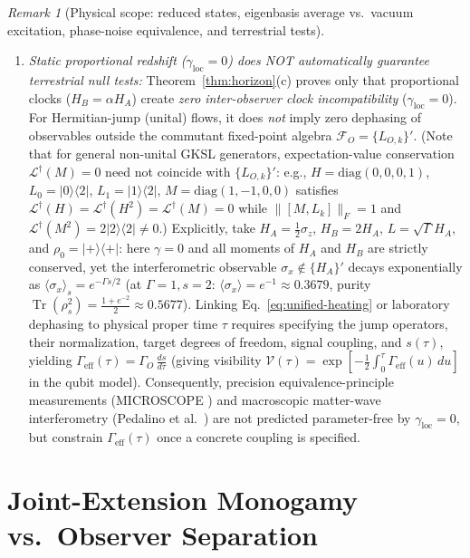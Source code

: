 \documentclass[11pt,a4paper]{article}
\theoremstyle{definition}
\theoremstyle{remark}
\newtheorem{remark}{Remark}
\newcommand{\Tr}{\operatorname{Tr}}
\newcommand{\cL}{\mathcal{L}}
\newcommand{\cF}{\mathcal{F}}
\newcommand{\1}{\mathbf{1}}
\newcommand{\normF}[1]{\|#1\|_F}
\begin{document}
\begin{remark}[Physical scope: reduced states, eigenbasis average vs.\ vacuum excitation, phase-noise equivalence, and terrestrial tests]
\begin{enumerate}
  \item \emph{Static proportional redshift ($\gamma_{\mathrm{loc}}=0$) does NOT automatically guarantee terrestrial null tests:} Theorem~\ref{thm:horizon}(c) proves only that proportional clocks ($H_B = \alpha H_A$) create \emph{zero inter-observer clock incompatibility} ($\gamma_{\mathrm{loc}} = 0$). For Hermitian-jump (unital) flows, it does \emph{not} imply zero dephasing of observables outside the commutant fixed-point algebra $\cF_O = \{L_{O,k}\}'$. (Note that for general non-unital GKSL generators, expectation-value conservation $\cL^\dagger(M)=0$ need not coincide with $\{L_{O,k}\}'$: e.g., $H=\mathrm{diag}(0,0,0,1)$, $L_0=|0\rangle\langle 2|$, $L_1=|1\rangle\langle 2|$, $M=\mathrm{diag}(1,-1,0,0)$ satisfies $\cL^\dagger(H)=\cL^\dagger(H^2)=\cL^\dagger(M)=0$ while $\normF{[M,L_k]}=1$ and $\cL^\dagger(M^2)=2|2\rangle\langle 2|\neq 0$.) Explicitly, take $H_A = \frac{1}{2}\sigma_z$, $H_B = 2H_A$, $L = \sqrt{\Gamma}H_A$, and $\rho_0 = |+\rangle\langle +|$: here $\gamma = 0$ and all moments of $H_A$ and $H_B$ are strictly conserved, yet the interferometric observable $\sigma_x \notin \{H_A\}'$ decays exponentially as $\langle\sigma_x\rangle_s = e^{-\Gamma s/2}$ (at $\Gamma=1, s=2$: $\langle\sigma_x\rangle = e^{-1} \approx 0.3679$, purity $\Tr(\rho_s^2) = \frac{1+e^{-2}}{2} \approx 0.5677$). Linking Eq.~\eqref{eq:unified-heating} or laboratory dephasing to physical proper time $\tau$ requires specifying the jump operators, their normalization, target degrees of freedom, signal coupling, and $s(\tau)$, yielding $\Gamma_{\mathrm{eff}}(\tau) = \Gamma_O\,\frac{ds}{d\tau}$ (giving visibility $\mathcal{V}(\tau) = \exp[-\frac{1}{2}\int_0^\tau \Gamma_{\mathrm{eff}}(u)\,du]$ in the qubit model). Consequently, precision equivalence-principle measurements (MICROSCOPE \cite{MICROSCOPE2022}) and macroscopic matter-wave interferometry (Pedalino et al.\ \cite{Pedalino2025}) are not predicted parameter-free by $\gamma_{\mathrm{loc}}=0$, but constrain $\Gamma_{\mathrm{eff}}(\tau)$ once a concrete coupling is specified.
\end{enumerate}
\end{remark}

\section{Joint-Extension Monogamy vs.\ Observer Separation}\label{sec:cpl}
\end{document}
